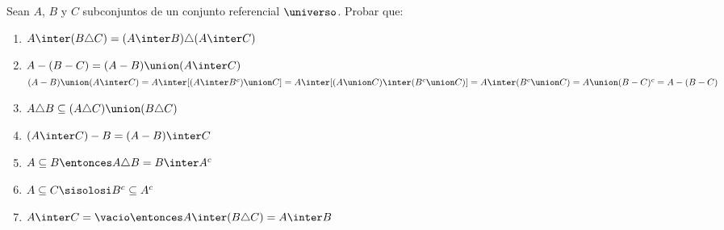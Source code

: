 \ejercicio Sean $A$, $B$ y $C$ subconjuntos de un conjunto referencial $\universo$. Probar que:
\begin{enumerate}[label=\roman*)]
	\item $A \inter (B \triangle C) = (A \inter B) \triangle (A \inter C)$

	\item $A - (B - C) = (A-B) \union (A \inter C)$\\
	      $(A - B) \union (A \inter C) = A \inter [(A \inter B^c) \union C] = A \inter [(A \union C) \inter (B^c \union C)] =\\
		      A \inter (B^c \union C) = A \union(B-C)^c = A - (B - C)$

	\item $A \triangle B \subseteq (A \triangle C) \union (B \triangle C)$ \Hacer
	\item $(A \inter C ) - B = (A - B) \inter C$
	\item $A \subseteq B \entonces A \triangle B = B \inter A^c$
	\item $A \subseteq C \sisolosi B^c \subseteq A^c$
	\item $A \inter C = \vacio \entonces A \inter (B \triangle C) = A \inter B$
\end{enumerate}
